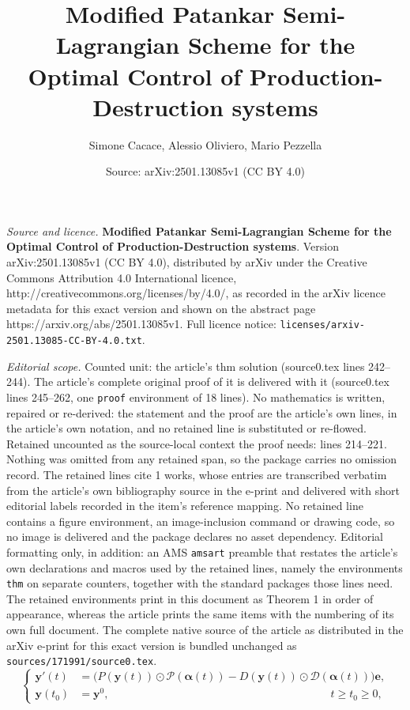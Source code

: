 \documentclass[10pt,a4paper]{amsart}
\title{{\Large \bf Modified Patankar Semi-Lagrangian Scheme for the Optimal Control of Production-Destruction systems}}
\author{Simone Cacace, Alessio Oliviero, Mario Pezzella}
\date{Source: arXiv:2501.13085v1 (CC BY 4.0)}
\begin{document}
\maketitle

\noindent\emph{Source and licence.} {\Large \bf Modified Patankar Semi-Lagrangian Scheme for the Optimal Control of Production-Destruction systems}. Version arXiv:2501.13085v1 (CC BY 4.0), distributed by arXiv under the Creative Commons Attribution 4.0 International licence, http://creativecommons.org/licenses/by/4.0/, as recorded in the arXiv licence metadata for this exact version and shown on the abstract page https://arxiv.org/abs/2501.13085v1. Full licence notice: \texttt{licenses/arxiv-2501.13085-CC-BY-4.0.txt}.\par\smallskip

\noindent\textit{Editorial scope.} Counted unit: the article's thm solution (source0.tex lines 242--244). The article's complete original proof of it is delivered with it (source0.tex lines 245--262, one \texttt{proof} environment of 18 lines). No mathematics is written, repaired or re-derived: the statement and the proof are the article's own lines, in the article's own notation, and no retained line is substituted or re-flowed.  Retained uncounted as the source-local context the proof needs: lines 214--221.  Nothing was omitted from any retained span, so the package carries no omission record.  The retained lines cite 1 works, whose entries are transcribed verbatim from the article's own bibliography source in the e-print and delivered with short editorial labels recorded in the item's reference mapping.  No retained line contains a figure environment, an image-inclusion command or drawing code, so no image is delivered and the package declares no asset dependency.  Editorial formatting only, in addition: an AMS \texttt{amsart} preamble that restates the article's own declarations and macros used by the retained lines, namely the environments \texttt{thm} on separate counters, together with the standard packages those lines need.  The retained environments print in this document as Theorem 1 in order of appearance, whereas the article prints the same items with the numbering of its own full document.  The complete native source of the article as distributed in the arXiv e-print for this exact version is bundled unchanged as \texttt{sources/171991/source0.tex}.
\begin{equation}\label{eq:CPDS}
\left\{
\begin{aligned}
    \bm{y}'(t)&=\big(P(\bm{y}(t))\odot \mathcal{P}(\bm{\alpha}(t))-D(\bm{y}(t))\odot \mathcal{D}(\bm{\alpha}(t)) \big) \bm{e}, \\
    \bm{y}(t_0)&=\bm{y}^0, \qquad \qquad \qquad  \qquad \qquad \qquad  \qquad \qquad \qquad \qquad  t\geq t_0\geq 0,
\end{aligned}
\right.
\end{equation}
\end{document}
